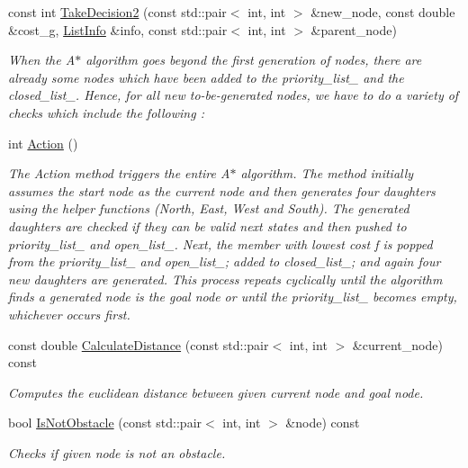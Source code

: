 \begin{DoxyCompactItemize}
const int \mbox{\hyperlink{class_maze_a078079ce7e963896360b22651206e13f}{Take\+Decision2}} (const std\+::pair$<$ int, int $>$ \&new\+\_\+node, const double \&cost\+\_\+g, \mbox{\hyperlink{struct_list_info}{List\+Info}} \&info, const std\+::pair$<$ int, int $>$ \&parent\+\_\+node)
\begin{DoxyCompactList}\small\item\em When the A$\ast$ algorithm goes beyond the first generation of nodes, there are already some nodes which have been added to the priority\+\_\+list\+\_\+ and the closed\+\_\+list\+\_\+. Hence, for all new to-\/be-\/generated nodes, we have to do a variety of checks which include the following \+: \end{DoxyCompactList}\item 
int \mbox{\hyperlink{class_maze_a1786d0ad38f1382bfd881ef38f53242c}{Action}} ()
\begin{DoxyCompactList}\small\item\em The Action method triggers the entire A$\ast$ algorithm. The method initially assumes the start node as the current node and then generates four daughters using the helper functions (North, East, West and South). The generated daughters are checked if they can be valid next states and then pushed to priority\+\_\+list\+\_\+ and open\+\_\+list\+\_\+. Next, the member with lowest cost f is popped from the priority\+\_\+list\+\_\+ and open\+\_\+list\+\_\+; added to closed\+\_\+list\+\_\+; and again four new daughters are generated. This process repeats cyclically until the algorithm finds a generated node is the goal node or until the priority\+\_\+list\+\_\+ becomes empty, whichever occurs first. \end{DoxyCompactList}\item 
const double \mbox{\hyperlink{class_maze_a63c6a579efa7406b44288b5dbc04cb02}{Calculate\+Distance}} (const std\+::pair$<$ int, int $>$ \&current\+\_\+node) const
\begin{DoxyCompactList}\small\item\em Computes the euclidean distance between given current node and goal node. \end{DoxyCompactList}\item 
bool \mbox{\hyperlink{class_maze_a8536c76dd1f35dee26c3a079d81cb0b4}{Is\+Not\+Obstacle}} (const std\+::pair$<$ int, int $>$ \&node) const
\begin{DoxyCompactList}\small\item\em Checks if given node is not an obstacle. \end{DoxyCompactList}\item 

\end{DoxyCompactItemize}
